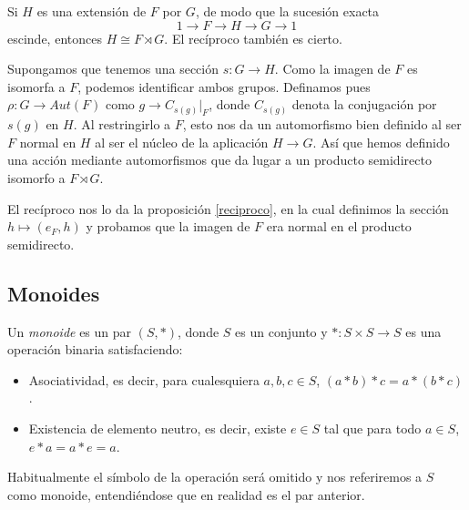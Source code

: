 \documentclass[TFG.tex]{subfiles}
\begin{document}
\begin{prop}\label{semidirect}
Si $H$ es una extensión de $F$ por $G$, de modo que la sucesión exacta 
\[
1\to F\to H\to G\to 1
\]
escinde, entonces $H\cong F\rtimes G$. El recíproco también es cierto. 
\end{prop}
\begin{dem}
Supongamos que tenemos una sección $s:G\to H$. Como la imagen de $F$ es isomorfa a $F$, podemos identificar ambos grupos. Definamos pues $\rho:G\to Aut(F)$ como $g\to C_{s(g)}|_F$, donde $C_{s(g)}$ denota la conjugación por $s(g)$ en $H$. Al restringirlo a $F$, esto nos da un automorfismo bien definido al ser $F$ normal en $H$ al ser el núcleo de la aplicación $H\to G$. Así que hemos definido una acción mediante automorfismos que da lugar a un producto semidirecto isomorfo a $F\rtimes G$. 

El recíproco nos lo da la proposición \ref{reciproco}, en la cual definimos la sección $h\mapsto (e_F,h)$ y probamos que la imagen de $F$ era normal en el producto semidirecto.
\QED
\end{dem}
% 
%


\subsection{Monoides}

\begin{defi}
Un \emph{monoide} es un par $(S,*)$, donde $S$ es un conjunto y $*:S\times S\to S$ es una operación binaria satisfaciendo:
\begin{itemize}
\item Asociatividad, es decir, para cualesquiera $a,b,c\in S$, $(a*b)*c=a*(b*c)$.
\item Existencia de elemento neutro, es decir, existe $e\in S$ tal que para todo $a\in S$, $e*a=a*e=a$. 
\end{itemize}
Habitualmente el símbolo de la operación será omitido y nos referiremos a $S$ como monoide, entendiéndose que en realidad es el par anterior.
\end{defi}
\end{document}
